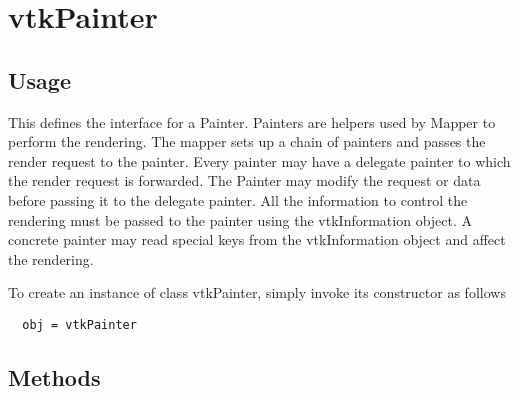 \section{vtkPainter}

\subsection{Usage}

 This defines the interface for a Painter. Painters are helpers used
 by Mapper to perform the rendering. The mapper sets up a chain of painters
 and passes the render request to the painter. Every painter may have a 
 delegate painter to which the render request is forwarded. The Painter may
 modify the request or data before passing it to the delegate painter. 
 All the information to control the rendering must be passed to the painter
 using the vtkInformation object. A concrete painter may read special keys
 from the vtkInformation object and affect the rendering.


To create an instance of class vtkPainter, simply
invoke its constructor as follows
\begin{verbatim}
  obj = vtkPainter
\end{verbatim}
\subsection{Methods}


